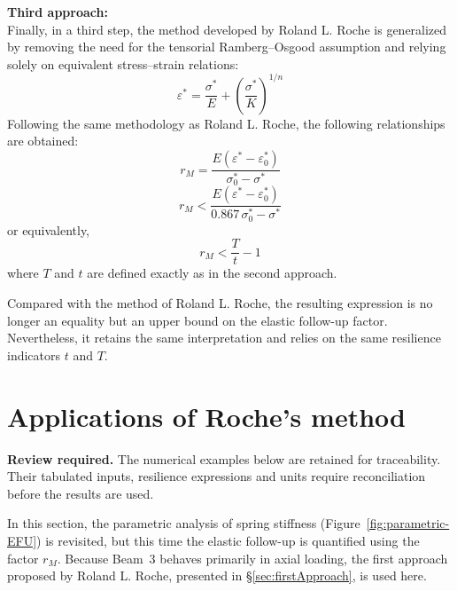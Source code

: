 \documentclass[10pt,a4paper]{article}
\let\oldsection\section
\newif\ifsectionstarted
\renewcommand{\section}{%
  \ifsectionstarted\clearpage\else\global\sectionstartedtrue\FloatBarrier\fi
  \oldsection}
\begin{document}
\vspace{1cm}
\textbf{Third approach:} \\
Finally, in a third step, the method developed by Roland L. Roche is generalized by removing the need for the tensorial Ramberg--Osgood assumption and relying solely on equivalent stress--strain relations:
\begin{equation*}
\varepsilon^* = \frac{\sigma^*}{E} + \left(\frac{\sigma^*}{K}\right)^{1/n}
\end{equation*}
Following the same methodology as Roland L. Roche, the following relationships are obtained:
\begin{equation*}
r_M=\frac{E\left(\varepsilon^*-\varepsilon_0^*\right)}
{\sigma_0^*-\sigma^*}
\end{equation*}
\begin{equation*}
r_M <
\frac{E\left(\varepsilon^*-\varepsilon_0^*\right)}
{0.867\,\sigma_0^*-\sigma^*}
\end{equation*}
or equivalently,
\begin{equation}
r_M < \frac{T}{t}-1
\label{def:EFU-3rd-overview}
\end{equation}
where \(T\) and \(t\) are defined exactly as in the second approach.

Compared with the method of Roland L. Roche, the resulting expression is no longer an equality but an upper bound on the elastic follow-up factor. Nevertheless, it retains the same interpretation and relies on the same resilience indicators \(t\) and \(T\).


\vspace{1cm}


\section{\texorpdfstring{}{Appendix \thesection: }Applications of Roche's method}
\label{application_roche}

\textbf{Review required.} The numerical examples below are retained for traceability. Their tabulated inputs, resilience expressions and units require reconciliation before the results are used.

In this section, the parametric analysis of spring stiffness (Figure~\ref{fig:parametric-EFU}) is revisited, but this time the elastic follow-up is quantified using the factor \(r_M\). Because Beam~3 behaves primarily in axial loading, the first approach proposed by Roland L. Roche, presented in §\ref{sec:firstApproach}, is used here. \\
\end{document}
